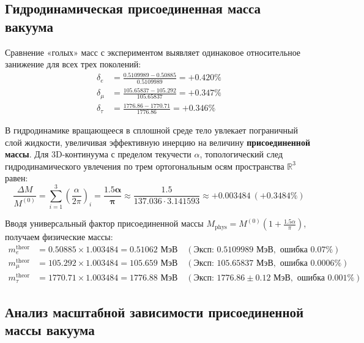 \documentclass[12pt,a4paper]{article}
\begin{document}
\subsection{Гидродинамическая присоединенная масса вакуума}
Сравнение «голых» масс с экспериментом выявляет одинаковое относительное занижение для всех трех поколений:
\begin{align}
	\delta_e &= \frac{0.5109989 - 0.50885}{0.5109989} = +0.420\% \\
	\delta_\mu &= \frac{105.65837 - 105.292}{105.65837} = +0.347\% \\
	\delta_\tau &= \frac{1776.86 - 1770.71}{1776.86} = +0.346\%
\end{align}

В гидродинамике вращающееся в сплошной среде тело увлекает пограничный слой жидкости, увеличивая эффективную инерцию на величину \textbf{присоединенной массы}.
Для 3D-континуума с пределом текучести $\alpha$, топологический след гидродинамического увлечения по трем ортогональным осям пространства $\mathbb{R}^3$ равен:
\begin{equation}
	\frac{\Delta M}{M^{(0)}} = \sum_{i=1}^3 \left( \frac{\alpha}{2\pi} \right)_i = \mathbf{\frac{1.5 \alpha}{\pi}} \approx \frac{1.5}{137.036 \cdot 3.141593} \approx +0.003484 \ (+0.3484\%)
\end{equation}

Вводя универсальный фактор присоединенной массы $M_{\text{phys}} = M^{(0)} \left( 1 + \frac{1.5\alpha}{\pi} \right)$, получаем физические массы:
\begin{align}
	m_e^{\text{theor}} &= 0.50885 \times 1.003484 = \mathbf{0.51062 \text{ МэВ}} \quad (\text{Эксп: } 0.5109989 \text{ МэВ}, \text{ ошибка } 0.07\%) \\
	m_\mu^{\text{theor}} &= 105.292 \times 1.003484 = \mathbf{105.659 \text{ МэВ}} \quad (\text{Эксп: } 105.65837 \text{ МэВ}, \text{ ошибка } 0.0006\%) \\
	m_\tau^{\text{theor}} &= 1770.71 \times 1.003484 = \mathbf{1776.88 \text{ МэВ}} \quad (\text{Эксп: } 1776.86 \pm 0.12 \text{ МэВ}, \text{ ошибка } 0.001\%)
\end{align}

\subsection{Анализ масштабной зависимости присоединенной массы вакуума}
\end{document}
